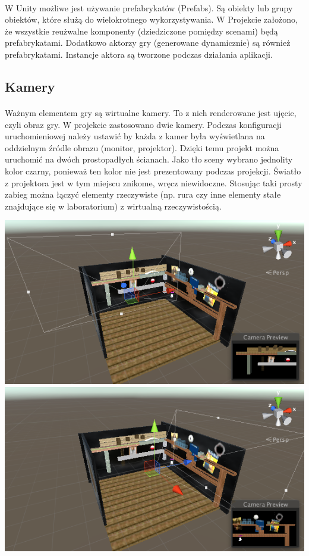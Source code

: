 \paragraph{}
W Unity możliwe jest używanie prefabrykatów (Prefabs\cite{prefab}). Są obiekty lub grupy obiektów, które służą do wielokrotnego wykorzystywania. W Projekcie założono, że wszystkie reużwalne komponenty (dziedziczone pomiędzy scenami) będą prefabrykatami.
Dodatkowo aktorzy gry (generowane dynamicznie) są również prefabrykatami. Instancje aktora są tworzone podczas działania aplikacji.
\newline
\subsection{Kamery}
\paragraph{}
Ważnym elementem gry są wirtualne kamery. To z nich renderowane jest ujęcie, czyli obraz gry. W projekcie zastosowano dwie kamery. Podczas konfiguracji uruchomieniowej należy ustawić by każda z kamer była wyświetlana na oddzielnym źródle obrazu (monitor, projektor). Dzięki temu projekt można uruchomić na dwóch prostopadłych ścianach.
Jako tło sceny wybrano jednolity kolor czarny, ponieważ ten kolor nie jest prezentowany podczas projekcji. Światło z projektora jest w tym miejscu znikome, wręcz niewidoczne. Stosując taki prosty zabieg można łączyć elementy rzeczywiste (np. rura czy inne elementy stałe znajdujące się w laboratorium) z wirtualną rzeczywistością.

\begin{center}
\includegraphics[width=1\textwidth]{images/kamera1.png}
\includegraphics[width=1\textwidth]{images/kamera2.png}
\end{center}

